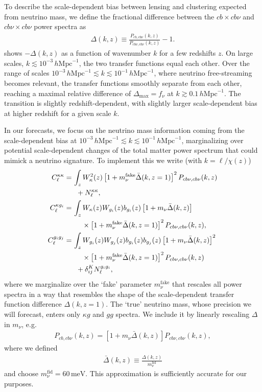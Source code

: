 \documentclass[prd,superscriptaddress,floatfix,notitlepage,nofootinbib,reprint]{revtex4-1} %
\begin{document}
To describe the scale-dependent bias between lensing and clustering expected from neutrino mass, we define the fractional difference between the $cb\times cb\nu$ and $cb\nu\times cb\nu$ power spectra as 
\begin{align}
  \label{eq:23}
  \Delta(k,z) \equiv \frac{P_{cb,cb\nu}(k,z)}{P_{cb\nu,cb\nu}(k,z)}-1.
\end{align}
 shows $-\Delta(k,z)$ as a function of wavenumber $k$ for a few redshifts $z$.
On large scales, $k\lesssim 10^{-3}\,h\mathrm{Mpc}^{-1}$, the two transfer functions equal each other.
Over the range of scales $10^{-3}\,h\mathrm{Mpc}^{-1}\lesssim k\lesssim 10^{-1}\,h\mathrm{Mpc}^{-1}$, where neutrino free-streaming becomes relevant, the transfer functions smoothly separate from each other, reaching a maximal relative difference of $\Delta_\mathrm{max}=f_\nu$ at $k\gtrsim 0.1\,h\mathrm{Mpc}^{-1}$.
The transition is slightly redshift-dependent, with slightly larger scale-dependent bias at higher redshift for a given scale $k$.

In our forecasts, we focus on the neutrino mass information coming from the scale-dependent bias at $10^{-3}\,h\mathrm{Mpc}^{-1}\lesssim k\lesssim 10^{-1}\,h\mathrm{Mpc}^{-1}$, marginalizing over potential scale-dependent changes of the total matter power spectrum that could mimick a neutrino signature.
To implement this we write (with $k=\ell/\chi(z)$)
\begin{align}
  C^{\kappa\kappa}_\ell =\,& \int_z W_\kappa^2(z)\left[1+m_\nu^\mathrm{fake}\bar\Delta(k,z=1)\right]^2 P_{cb\nu,cb\nu}(k,z) \non\\
&\,\;+ N^{\kappa\kappa}_\ell,\\
C^{\kappa g_i}_\ell =\,& \int_z W_\kappa(z)W_{g_i}(z) b_{g_i}(z)
\left[1+m_\nu\bar\Delta(k,z)\right]\non\\
&\quad\;\times 
\left[1+m_\nu^\mathrm{fake}\bar\Delta(k,z=1)\right]^2
P_{cb\nu,cb\nu}(k,z),\\
%
C^{g_ig_j}_\ell =\,&
\int_z W_{g_i}(z)W_{g_j}(z) b_{g_i}(z)b_{g_j}(z)\left[1+m_\nu\bar\Delta(k,z)\right]^2\non\\
&\quad\;\times\left[1+m_\nu^\mathrm{fake}\bar\Delta(k,z=1)\right]^2 P_{cb\nu,cb\nu}(k,z)\non\\
&\,\; + \delta_{ij}^KN^{g_ig_i}_\ell,
\label{eq:ClNeutrinos}
\end{align}
where we marginalize over the `fake' parameter $m_\nu^\mathrm{fake}$ that rescales all power spectra in a way that resembles the shape of the scale-dependent transfer function difference $\Delta(k,z=1)$.
The `true' neutrino mass, whose precision we will forecast, enters only $\kappa g$ and $gg$ spectra.
We include it by linearly rescaling $\Delta$ in $m_\nu$, e.g.
\begin{align}
  \label{eq:8}
P_{cb,cb\nu}(k,z)=\left[1+m_\nu\bar\Delta(k,z)\right]P_{cb\nu,cb\nu}(k,z),
\end{align}
where we defined
\begin{align}
  \label{eq:4}
  \bar\Delta(k,z) \equiv \frac{\Delta(k,z)}{m_\nu^\mathrm{fid}}
\end{align}
and choose $m_\nu^\mathrm{fid}=60\,\mathrm{meV}$.
This approximation is sufficiently accurate for our purposes.
\end{document}
